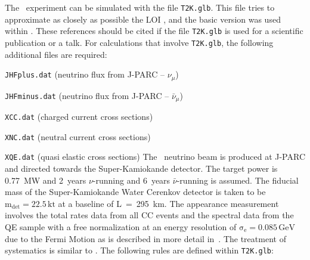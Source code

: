 The \TtoK\ experiment can be simulated with the file {\tt T2K.glb}. This file tries to approximate as closely as
possible the LOI \cite{Itow:2001ee}, and the basic version was used within \cite{Huber:2002mx}. These references
should be cited if the file {\tt T2K.glb} is used for a scientific publication or a talk. For calculations that
involve {\tt T2K.glb}, the following additional files are required: 
\bi
\item {\tt JHFplus.dat} (neutrino flux from J-PARC -- $\nu_\mu$)
\item {\tt JHFminus.dat} (neutrino flux from J-PARC -- $\bar{\nu}_\mu$)
\item {\tt XCC.dat} (charged current cross sections)
\item {\tt XNC.dat} (neutral current cross sections)
\item {\tt XQE.dat} (quasi elastic cross sections)
\ei
The \TtoK\ neutrino beam is produced at J-PARC and directed towards the Super-Kamiokande detector. The target
power is 0.77~MW and 2~years $\nu$-running and 6~years $\bar{\nu}$-running is assumed. The fiducial mass of the
Super-Kamiokande Water Cerenkov detector is taken to be $\mathrm{m_{det} = 22.5 \,kt}$ at a baseline of
L~=~295~km. The appearance measurement involves the total rates data from all CC events and the spectral data
from the QE sample with a free normalization at an energy resolution of $\mathrm{\sigma_e=0.085\, GeV}$ due to the
Fermi Motion as is described in more detail in~\cite{Huber:2002mx}. The treatment of systematics is similar to
\cite{Ishitsuka:2005qi}. The following rules are defined within {\tt T2K.glb}:  
